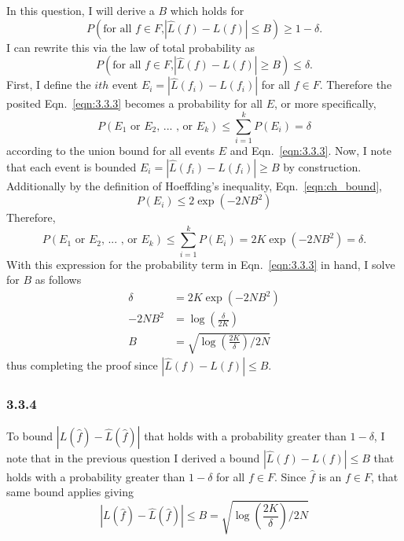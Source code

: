 \documentclass[12pt]{amsart}
\begin{document}
In this question, I will derive a $B$ which holds for
\begin{equation}
P(\text{for all $f \in F$,} |\hat{L}(f) - L(f)| \leq B) \geq 1 - \delta.
\end{equation}
I can rewrite this via the law of total probability as
\begin{equation} \label{eqn:3.3.3}
P(\text{for all $f \in F$,} |\hat{L}(f) - L(f)| \geq B) \leq \delta.
\end{equation}
First, I define the $ith$ event $E_i = |\hat{L}(f_i) - L(f_i)|$ for all $f \in F$.  Therefore the posited Eqn.~\ref{eqn:3.3.3} becomes a probability for all $E$, or more specifically,
\begin{equation}
P(E_1 \text{ or } E_2 \text{, ... , or } E_k) \leq \sum_{i = 1}^k P(E_i) = \delta
\end{equation}
according to the union bound for all events $E$ and Eqn.~\ref{eqn:3.3.3}.  Now, I note that each event is bounded $E_i = |\hat{L}(f_i) - L(f_i)| \geq B$ by construction.  
Additionally by the definition of Hoeffding's inequality, Eqn.~\ref{eqn:ch_bound},
\begin{equation}
P(E_i) \leq 2\exp(-2NB^2)
\end{equation}
Therefore, 
\begin{equation}
P(E_1 \text{ or } E_2 \text{, ... , or } E_k) \leq \sum_{i = 1}^k P(E_i) = 2K \exp(-2NB^2) = \delta.
\end{equation}
With this expression for the probability term in Eqn.~\ref{eqn:3.3.3} in hand, I solve for $B$ as follows
\begin{equation} \label{eqn:b}
\begin{split}
\delta & = 2K \exp(-2NB^2) \\
-2NB^2 & = \log(\frac{\delta}{2K}) \\
B & = \sqrt{\log(\frac{2K}{\delta})/2N}
\end{split}
\end{equation}
thus completing the proof since $|\hat{L}(f) - L(f)| \leq B$.

\subsubsection*{3.3.4}

To bound $|L(\hat{f}) - \hat{L}(\hat{f})|$ that holds with a probability greater than $1 - \delta$, I note that in the previous question I derived a bound $|\hat{L}(f) - L(f)| \leq B$ that holds with a probability greater than $1 - \delta$ for all $f \in F$.  Since $\hat{f}$ is an $f \in F$, that same bound applies giving 
\begin{equation}
|L(\hat{f}) - \hat{L}(\hat{f})| \leq B = \sqrt{\log(\frac{2K}{\delta})/2N}
\end{equation}
\end{document}
